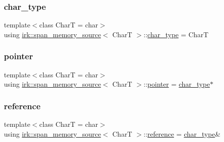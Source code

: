 \subsubsection{\texorpdfstring{char\+\_\+type}{char\_type}}
{\footnotesize\ttfamily template$<$class CharT  = char$>$ \\
using \mbox{\hyperlink{classirk_1_1span__memory__source}{irk\+::span\+\_\+memory\+\_\+source}}$<$ CharT $>$\+::\mbox{\hyperlink{classirk_1_1span__memory__source_a769d88b11f7c2882a006e93edb2cdb79}{char\+\_\+type}} =  CharT}

\mbox{\label{classirk_1_1span__memory__source_a3f49fb36995410156dd5798dca6cab91}} 
\subsubsection{\texorpdfstring{pointer}{pointer}}
{\footnotesize\ttfamily template$<$class CharT  = char$>$ \\
using \mbox{\hyperlink{classirk_1_1span__memory__source}{irk\+::span\+\_\+memory\+\_\+source}}$<$ CharT $>$\+::\mbox{\hyperlink{classirk_1_1span__memory__source_a3f49fb36995410156dd5798dca6cab91}{pointer}} =  \mbox{\hyperlink{classirk_1_1span__memory__source_a769d88b11f7c2882a006e93edb2cdb79}{char\+\_\+type}}$\ast$}

\mbox{\label{classirk_1_1span__memory__source_a4be24e4607769eb96ea8e6071ad1348e}} 
\subsubsection{\texorpdfstring{reference}{reference}}
{\footnotesize\ttfamily template$<$class CharT  = char$>$ \\
using \mbox{\hyperlink{classirk_1_1span__memory__source}{irk\+::span\+\_\+memory\+\_\+source}}$<$ CharT $>$\+::\mbox{\hyperlink{classirk_1_1span__memory__source_a4be24e4607769eb96ea8e6071ad1348e}{reference}} =  \mbox{\hyperlink{classirk_1_1span__memory__source_a769d88b11f7c2882a006e93edb2cdb79}{char\+\_\+type}}\&}



